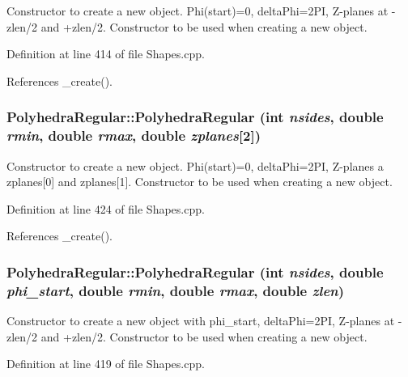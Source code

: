 Constructor to create a new object. Phi(start)=0, deltaPhi=2PI, Z-\/planes at -\/zlen/2 and +zlen/2. Constructor to be used when creating a new object. 

Definition at line 414 of file Shapes.cpp.

References \_\-create().\hypertarget{class_d_d4hep_1_1_geometry_1_1_polyhedra_regular_a0fd96974d56ca2fb51494fc69d9c0443}{
\subsubsection[{PolyhedraRegular}]{\setlength{\rightskip}{0pt plus 5cm}PolyhedraRegular::PolyhedraRegular (int {\em nsides}, \/  double {\em rmin}, \/  double {\em rmax}, \/  double {\em zplanes}\mbox{[}2\mbox{]})}}
\label{class_d_d4hep_1_1_geometry_1_1_polyhedra_regular_a0fd96974d56ca2fb51494fc69d9c0443}


Constructor to create a new object. Phi(start)=0, deltaPhi=2PI, Z-\/planes a zplanes\mbox{[}0\mbox{]} and zplanes\mbox{[}1\mbox{]}. Constructor to be used when creating a new object. 

Definition at line 424 of file Shapes.cpp.

References \_\-create().\hypertarget{class_d_d4hep_1_1_geometry_1_1_polyhedra_regular_a753b26a4ca8dc57fe9f3d1396a9acb81}{
\subsubsection[{PolyhedraRegular}]{\setlength{\rightskip}{0pt plus 5cm}PolyhedraRegular::PolyhedraRegular (int {\em nsides}, \/  double {\em phi\_\-start}, \/  double {\em rmin}, \/  double {\em rmax}, \/  double {\em zlen})}}
\label{class_d_d4hep_1_1_geometry_1_1_polyhedra_regular_a753b26a4ca8dc57fe9f3d1396a9acb81}


Constructor to create a new object with phi\_\-start, deltaPhi=2PI, Z-\/planes at -\/zlen/2 and +zlen/2. Constructor to be used when creating a new object. 

Definition at line 419 of file Shapes.cpp.

